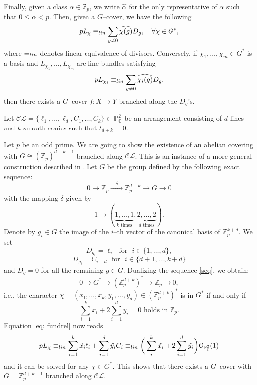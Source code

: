 \documentclass[12pt]{amsart}
\theoremstyle{plain}
\theoremstyle{definition}
\renewcommand\leq{\leqslant}
\begin{document}
Finally, given a class $\alpha \in \mathbb{Z}_{p}$, we write $\hat{\alpha}$ for the only representative of $\alpha$ such that $0 \leq \alpha < p$. Then, given a $G$--cover, we have the following
\begin{equation}\label{eq: fundrel}
pL_{\chi} \equiv_{{\rm lin}} \sum_{g\neq 0} \widehat{\chi(g)}D_{g}, \quad \forall \chi \in G^{*},
\end{equation}
where $\equiv_{{\rm lin}}$ denotes linear equivalence of divisors.
Conversely, if $\chi_{1}, \dots, \chi_{m} \in G^{*}$ is a basis and $L_{\chi_1}, \dots, L_{\chi_{m}}$ are line bundles satisfying 
\begin{equation*}
pL_{\chi_{i}} \equiv_{{\rm lin}} \sum_{g\neq 0} \widehat{\chi_{i}(g)}D_{g}.
\end{equation*}
then there exists a $G$--cover $f \colon X \rightarrow Y$ branched along the $D_{g}$'s.  

Let $\mathcal{CL} = \{\ell_{1}, \ldots, \ell_{d}, C_{1}, \ldots, C_{k}\} \subset \mathbb{P}^{2}_{\mathbb{C}}$ be an arrangement consisting of $d$ lines and $k$ smooth conics such that $t_{d+k}=0$. 

Let $p$ be an odd prime. We are going to show the existence of an abelian covering with $G \cong (\mathbb{Z}_{p})^{d+k-1}$ branched along $\mathcal{CL}$. This is an instance of a more general construction described in \cite[\S~2.2]{AP}.
Let $G$ be the group defined by the following exact sequence:
\begin{equation}
\label{seq}
    0 \longrightarrow \mathbb{Z}_{p} \xrightarrow{\quad \delta \quad} \mathbb{Z}_{p}^{d+k} \longrightarrow G \longrightarrow 0 
\end{equation}
with the mapping $\delta$ given by
$$1 \rightarrow (\underbrace{1, \dots, 1}_{k \text{ times}}, \underbrace{2, \dots, 2}_{d \text{ times}}).$$
Denote by $g_{i} \in G$ the image of the $i$--th vector of the canonical basis of $\mathbb{Z}_{p}^{k+d}$. We set
$$D_{g_{i}} = \ell_{i} \,\, \text{ for } \,\, i \in \{1, \dots, d\},$$
$$D_{g_{i}} = C_{i-d} \,\, \text{ for } \,\, i \in \{d+1, \dots, k+d\}$$
and $D_g=0$ for all the remaining $g\in G$.
Dualizing the sequence \eqref{seq}, we obtain:
$$0\longrightarrow G^{*} \longrightarrow \left(\mathbb{Z}_{p}^{d+k}\right)^* \rightarrow \mathbb{Z}_{p} \longrightarrow 0,$$
i.e., the character $\chi = (x_{1}, \dots, x_{k},y_{1}, \dots, y_{d}) \in \left(\mathbb{Z}_{p}^{d+k}\right)^* $ is in $G^{*}$ if and only if $$\sum_{i=1}^{k}x_{i} + 2\sum_{i=1}^{d}y_{i} = 0 \text{ holds in } \mathbb{Z}_{p}.$$
Equation \eqref{eq: fundrel} now reads
$$pL_{\chi} \equiv_{{\rm lin}}\sum_{i=1}^{k} \hat{x_{i}}\ell_{i} + \sum_{i=1}^{d} \hat{y_{i}}C_{i} \equiv_{{\rm lin}} \bigg( \sum_{i}^{k}\hat{x_{i}} + 2\sum_{i=1}^{d}\hat{y_{i}}\bigg)\mathcal{O}_{\mathbb{P}^{2}_{\mathbb{C}}}(1)$$
and it can be solved for any $\chi \in G^{*}$. This shows that there exists a $G$--cover with $G = \mathbb{Z}_p^{d+k-1}$ branched along $\mathcal{CL}$. 
\end{document}
